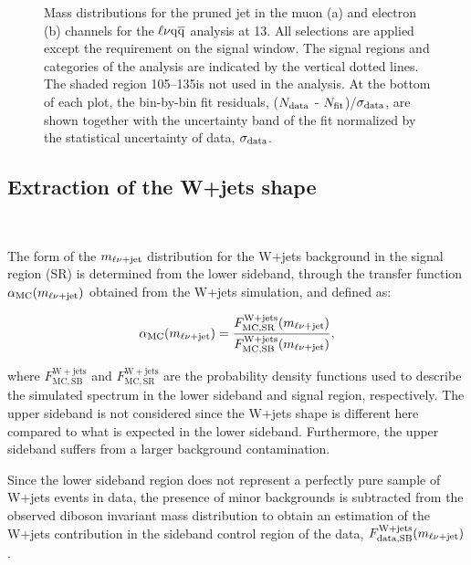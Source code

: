 \begin{figure}[!htb]
\centering     %
{}
\caption{Mass distributions for the pruned jet in the muon (a) and electron (b) channels for the $\ell\nu\mathrm{q}\overline{\mathrm{q}}$ analysis at 13\TeV. All selections are applied except the requirement on the \mJ signal window. The signal regions and \mJ categories of the analysis are indicated by the vertical dotted lines. The shaded \mJ region 105--135\GeV is not used in the analysis. At the bottom of each plot, the bin-by-bin fit residuals, ($N_{\rm data}$ - $N_{\rm fit}$)/$\sigma_{\rm data}$, are shown together with the uncertainty band of the fit normalized by the statistical uncertainty of data, $\sigma_{\rm data}$.}
\label{fig:mjfit13TeV}
\end{figure}

\subsection{Extraction of the W+jets shape}~\label{subsec:wjetshape}

The form of the $m_{\ell\nu+{\rm jet}}$ distribution for the W+jets background in the signal region (SR) is determined from the lower \mJ sideband, through the transfer function $\alpha_\mathrm{MC}(m_{\ell\nu+{\rm jet}})$ obtained from the W+jets simulation, and defined as:

\begin{equation}
\alpha_\mathrm{MC}(m_{\ell\nu+{\rm jet}}) = \frac{F_\mathrm{MC, SR}^{\mathrm{W+jets}}(m_{\ell\nu+{\rm jet}})}{F_\mathrm{MC, SB}^{\mathrm{W+jets}}(m_{\ell\nu+{\rm jet}})},
\end{equation}

where $F_\mathrm{MC, SB}^{\mathrm{W+jets}}$ and $F_\mathrm{MC, SR}^{\mathrm{W+jets}}$ are the probability density functions used to describe the simulated \mlvj spectrum in the lower \mJ sideband and signal region, respectively.
The upper \mJ sideband is not considered since the W+jets shape is different here compared to what is expected in the lower sideband. Furthermore, the upper sideband suffers from a larger \ttbar background contamination.

Since the lower sideband region does not represent a perfectly pure sample of W+jets events in data, the presence of minor backgrounds is subtracted from the observed diboson invariant mass distribution
to obtain an estimation of the W+jets contribution in the sideband control region of the data, $F_\mathrm{data, SB}^{\mathrm{W+jets}}(m_{\ell\nu+{\rm jet}})$.

